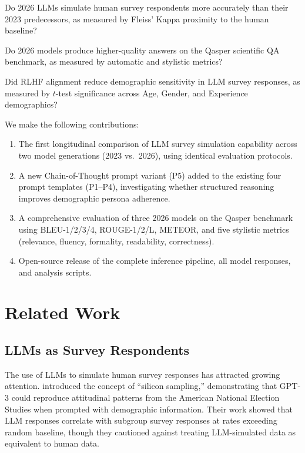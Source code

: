 \documentclass[11pt,a4paper]{article}
\begin{document}
\begin{description}[leftmargin=2em]
  \item[\textbf{RQ1}] Do 2026 LLMs simulate human survey respondents more
    accurately than their 2023 predecessors, as measured by Fleiss' Kappa
    proximity to the human baseline?
  \item[\textbf{RQ2}] Do 2026 models produce higher-quality answers on the
    Qasper scientific QA benchmark, as measured by automatic and stylistic
    metrics?
  \item[\textbf{RQ3}] Did RLHF alignment reduce demographic sensitivity in LLM
    survey responses, as measured by $t$-test significance across Age, Gender,
    and Experience demographics?
\end{description}

\medskip\noindent
We make the following contributions:

\begin{enumerate}
  \item The first longitudinal comparison of LLM survey simulation capability
    across two model generations (2023 vs.\ 2026), using identical evaluation
    protocols.
  \item A new Chain-of-Thought prompt variant (P5) added to the existing four
    prompt templates (P1--P4), investigating whether structured reasoning
    improves demographic persona adherence.
  \item A comprehensive evaluation of three 2026 models on the Qasper benchmark
    using BLEU-1/2/3/4, ROUGE-1/2/L, METEOR, and five stylistic metrics
    (relevance, fluency, formality, readability, correctness).
  \item Open-source release of the complete inference pipeline, all model
    responses, and analysis scripts.
\end{enumerate}

\section{Related Work}
\label{sec:related}

\subsection{LLMs as Survey Respondents}

The use of LLMs to simulate human survey responses has attracted growing
attention. \citet{argyle2023} introduced the concept of ``silicon sampling,''
demonstrating that GPT-3 could reproduce attitudinal patterns from the American
National Election Studies when prompted with demographic information. Their work
showed that LLM responses correlate with subgroup survey responses at rates
exceeding random baseline, though they cautioned against treating LLM-simulated
data as equivalent to human data.
\end{document}
